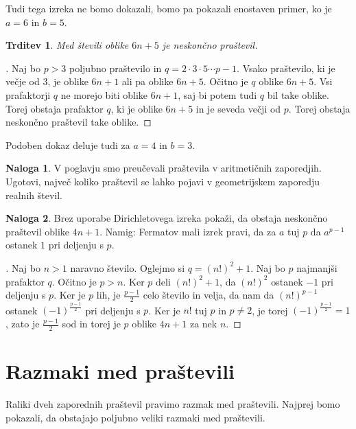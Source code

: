 \documentclass[a4paper,12pt]{article}
\theoremstyle{definition}
\newtheorem{naloga}{Naloga}
\theoremstyle{plain}
\newtheorem{trditev}{Trditev}
\newenvironment{dokaz}{\begin{proof}[\bfseries\upshape\proofname]}{\end{proof}}
\begin{document}
Tudi tega izreka ne bomo dokazali, bomo pa pokazali enostaven primer, ko je $a = 6$ in $b = 5$.

\begin{trditev}
    Med števili oblike $6n + 5$ je neskončno praštevil.
\end{trditev}
\begin{dokaz}
    Naj bo $p > 3$ poljubno praštevilo in $q = 2 \cdot 3 \cdot 5 \cdots p - 1$. Vsako praštevilo, ki je večje od $3$, je oblike $6n + 1$ ali pa oblike $6n + 5$. Očitno je $q$ oblike $6n + 5$. Vsi prafaktorji $q$ ne morejo biti oblike $6n + 1$, saj bi potem tudi $q$ bil take oblike. Torej obstaja prafaktor $q$, ki je oblike $6n + 5$ in je seveda večji od $p$. Torej obstaja neskončno praštevil take oblike.
\end{dokaz}

Podoben dokaz deluje tudi za $a = 4$ in $b = 3$.

\begin{naloga}
    V poglavju smo preučevali praštevila v aritmetičnih zaporedjih. Ugotovi, največ koliko praštevil se lahko pojavi v geometrijskem zaporedju realnih števil.
\end{naloga}

\begin{naloga}
    Brez uporabe Dirichletovega izreka pokaži, da obstaja neskončno praštevil oblike $4n + 1$.
    Namig: Fermatov mali izrek pravi, da za $a$ tuj $p$ da $a^{p - 1}$ ostanek $1$ pri deljenju s $p$.
\end{naloga}
\begin{dokaz}
    Naj bo $n > 1$ naravno število. Oglejmo si $q = (n!)^2 + 1$. Naj bo $p$ najmanjši prafaktor $q$. Očitno je $p > n$. Ker $p$ deli $(n!)^2 + 1$, da $(n!)^2$ ostanek $-1$ pri deljenju s $p$. Ker je $p$ lih, je $\frac{p - 1}{2}$ celo število in velja, da nam da $(n!)^{p - 1}$ ostanek $(-1)^{\frac{p - 1}{2}}$ pri deljenju s $p$. Ker je $n!$ tuj $p$ in $p \neq 2$, je torej $(-1)^{\frac{p - 1}{2}} = 1$, zato je $\frac{p - 1}{2}$ sod in torej je $p$ oblike $4n + 1$ za nek $n$.
\end{dokaz}



\section{Razmaki med praštevili}
Raliki dveh zaporednih praštevil pravimo razmak med praštevili. Najprej bomo pokazali, da obstajajo poljubno veliki razmaki med praštevili.
\end{document}
